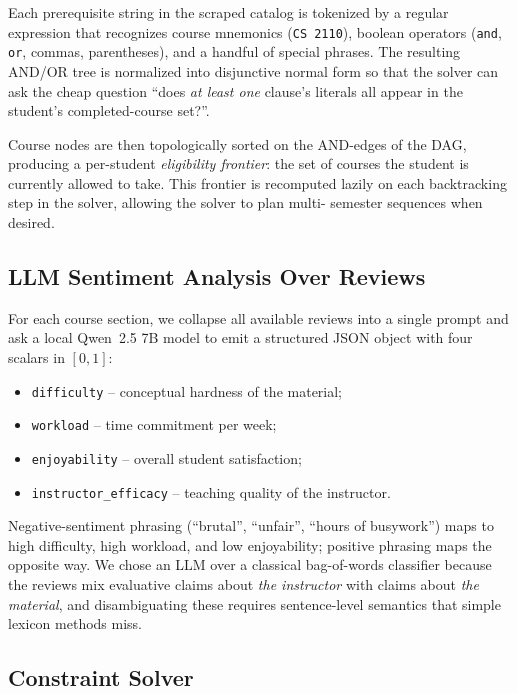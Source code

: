 \documentclass[10pt,letterpaper]{article}
\newcommand{\code}[1]{\texttt{\small #1}}
\begin{document}
Each prerequisite string in the scraped catalog is tokenized by a regular
expression that recognizes course mnemonics (\code{CS\,2110}), boolean
operators (\code{and}, \code{or}, commas, parentheses), and a handful of
special phrases. The resulting AND/OR tree is normalized into disjunctive
normal form so that the solver can ask the cheap question
``does \emph{at least one} clause's literals all appear in the student's
completed-course set?''.

Course nodes are then topologically sorted on the AND-edges of the DAG,
producing a per-student \emph{eligibility frontier}: the set of courses the
student is currently allowed to take. This frontier is recomputed lazily on
each backtracking step in the solver, allowing the solver to plan multi-
semester sequences when desired.

\subsection{LLM Sentiment Analysis Over Reviews}

For each course section, we collapse all available reviews into a single
prompt and ask a local Qwen~2.5 7B model to emit a structured JSON object
with four scalars in $[0,1]$:
\begin{itemize}[leftmargin=*,topsep=1pt,itemsep=1pt]
  \item \code{difficulty} -- conceptual hardness of the material;
  \item \code{workload} -- time commitment per week;
  \item \code{enjoyability} -- overall student satisfaction;
  \item \code{instructor\_efficacy} -- teaching quality of the
    instructor.
\end{itemize}
Negative-sentiment phrasing (``brutal'', ``unfair'', ``hours of busywork'')
maps to high difficulty, high workload, and low enjoyability; positive
phrasing maps the opposite way. We chose an LLM over a classical
bag-of-words classifier because the reviews mix evaluative claims about
\emph{the instructor} with claims about \emph{the material}, and
disambiguating these requires sentence-level semantics that simple lexicon
methods miss.

\subsection{Constraint Solver}
\end{document}
